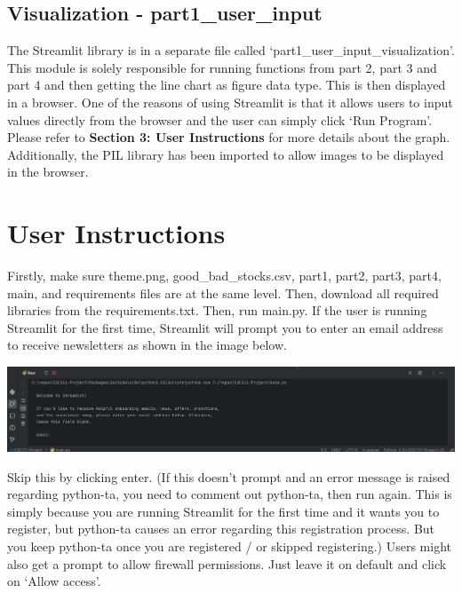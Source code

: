 \documentclass[fontsize=11pt]{article}
\begin{document}
\subsection{Visualization - part1\_user\_input}
The Streamlit library is in a separate file called `part1\_user\_input\_visualization'. This module is solely responsible for running functions from part 2, part 3 and part 4 and then getting the line chart as figure data type. This is then displayed in a browser. One of the reasons of using Streamlit is that it allows users to input values directly from the browser and the user can simply click `Run Program'. Please refer to \textbf{Section 3: User Instructions} for more details about the graph. Additionally, the PIL library has been imported to allow images to be displayed in the browser. 

\section{User Instructions}
Firstly, make sure theme.png, good\_bad\_stocks.csv, part1, part2, part3, part4, main, and requirements files are at the same level. Then, download all required libraries from the requirements.txt. Then, run main.py. If the user is running Streamlit for the first time, Streamlit will prompt you to enter an email address to receive newsletters as shown in the image below.
\begin{center}
\includegraphics[scale=0.27]{streamlit_prompt.png}
\end{center} 
Skip this by clicking enter. (If this doesn't prompt and an error message is raised regarding python-ta, you need to comment out python-ta, then run again. This is simply because you are running Streamlit for the first time and it wants you to register, but python-ta causes an error regarding this registration process. But you keep python-ta once you are registered / or skipped registering.)
Users might also get a prompt to allow firewall permissions. Just leave it on default and click on `Allow access'. 
\end{document}
